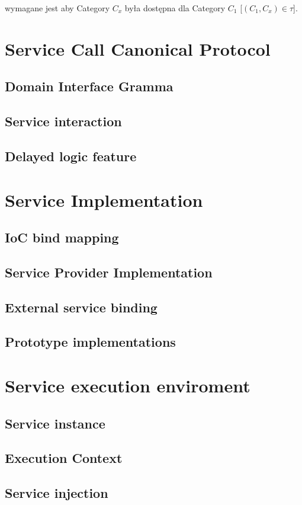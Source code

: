 \documentclass[a4paper,10pt]{article}
\begin{document}
wymagane jest aby Category $C_x$ była dostępna dla Category $C_1$ [$(C_1,C_x)\in \tau $].


\section{Service Call Canonical Protocol}
\subsection{Domain Interface Gramma}
\subsection{Service interaction}
\subsection{Delayed logic feature}

\section{Service Implementation}
\subsection{IoC bind mapping}
\subsection{Service Provider Implementation}
\subsection{External service binding}
\subsection{Prototype implementations}

\section{Service execution enviroment}
\subsection{Service instance}
\subsection{Execution Context}
\subsection{Service injection}
\end{document}
